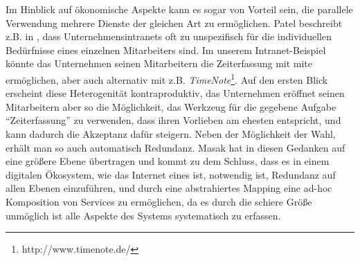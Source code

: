Im Hinblick auf ökonomische Aspekte kann es sogar von Vorteil sein, die parallele Verwendung mehrere Dienste der gleichen Art zu ermöglichen. Patel beschreibt z.B. in \cite[S.29]{pl-depintra}, dass Unternehmensintranets oft zu unspezifisch für die individuellen Bedürfnisse eines einzelnen Mitarbeiters sind. Im unserem Intranet-Beispiel könnte das Unternehmen seinen Mitarbeitern die Zeiterfassung mit \ac{mite} ermöglichen, aber auch alternativ mit z.B. \emph{TimeNote}\footnote{http://www.timenote.de/}. Auf den ersten Blick erscheint diese Heterogenität kontraproduktiv, das Unternehmen eröffnet seinen Mitarbeitern aber so die Möglichkeit, das Werkzeug für die gegebene Aufgabe "`Zeiterfassung"' zu verwenden, dass ihren  Vorlieben am ehesten entspricht, und kann dadurch die Akzeptanz dafür steigern. Neben der Möglichkeit der Wahl, erhält man so auch automatisch Redundanz. Masak hat in \cite[S.236ff]{mkdigioe} diesen Gedanken auf eine größere Ebene übertragen und kommt zu dem Schluss, dass es in einem digitalen Ökosystem, wie das Internet eines ist, notwendig ist, Redundanz auf allen Ebenen einzuführen, und durch eine abstrahiertes Mapping eine ad-hoc Komposition von Services zu ermöglichen, da es durch die schiere Größe unmöglich ist alle Aspekte des Systems systematisch zu erfassen.

